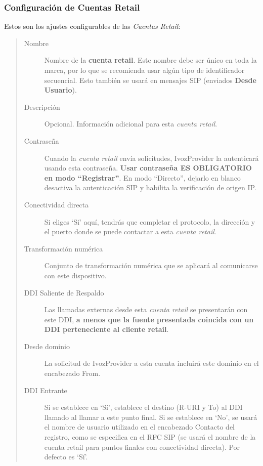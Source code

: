\documentclass[letterpaper,10pt,spanish]{sphinxmanual}
\begin{document}
\subsubsection{Configuración de Cuentas Retail}
\label{administration_portal/client/retail/retail_accounts:retail-accounts-configuration}
Estos son los ajustes configurables de las \emph{Cuentas Retail}:
\begin{quote}
\begin{description}
\item[{Nombre}] \leavevmode
Nombre de la \textbf{cuenta retail}. Este nombre debe ser único en toda la marca, por lo que se recomienda usar algún tipo de identificador secuencial. Esto también se usará en mensajes SIP (enviados \textbf{Desde Usuario}).

\item[{Descripción}] \leavevmode
Opcional. Información adicional para esta \emph{cuenta retail}.

\item[{Contraseña}] \leavevmode
Cuando la \emph{cuenta retail} envía solicitudes, IvozProvider la autenticará usando esta contraseña. \textbf{Usar contraseña ES OBLIGATORIO en modo ``Registrar''}. En modo ``Directo'', dejarlo en blanco desactiva la autenticación SIP y habilita la verificación de origen IP.

\item[{Conectividad directa}] \leavevmode
Si eliges `Sí' aquí, tendrás que completar el protocolo, la dirección y el puerto donde se puede contactar a esta \emph{cuenta retail}.

\item[{Transformación numérica}] \leavevmode
Conjunto de transformación numérica que se aplicará al comunicarse con este dispositivo.

\item[{DDI Saliente de Respaldo}] \leavevmode
Las llamadas externas desde esta \emph{cuenta retail} se presentarán con este DDI, \textbf{a menos que la fuente presentada coincida con un DDI perteneciente al cliente retail}.

\item[{Desde dominio}] \leavevmode
La solicitud de IvozProvider a esta cuenta incluirá este dominio en el encabezado From.

\item[{DDI Entrante}] \leavevmode
Si se establece en `Sí', establece el destino (R-URI y To) al DDI llamado al llamar a este punto final. Si se establece en `No', se usará el nombre de usuario utilizado en el encabezado Contacto del registro, como se especifica en el RFC SIP (se usará el nombre de la cuenta retail para puntos finales con conectividad directa). Por defecto es `Sí'.


\end{description}
\end{quote}
\end{document}
